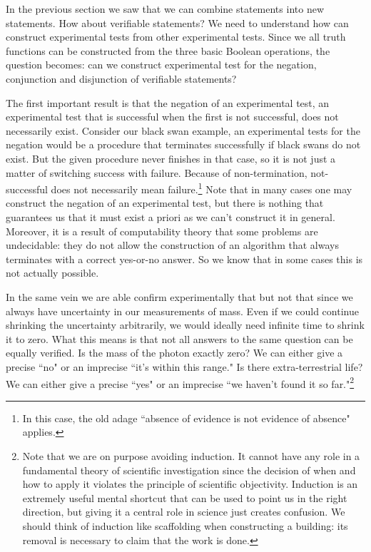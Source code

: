 \documentclass[11pt,letterpaper,fleqn]{memoir} %
\begin{document}
In the previous section we saw that we can combine statements into new statements. How about verifiable statements? We need to understand how can construct experimental tests from other experimental tests. Since we all truth functions can be constructed from the three basic Boolean operations, the question becomes: can we construct experimental test for the negation, conjunction and disjunction of verifiable statements?

The first important result is that the negation of an experimental test, an experimental test that is successful when the first is not successful, does not necessarily exist. Consider our black swan example, an experimental tests for the negation would be a procedure that terminates successfully if black swans do not exist. But the given procedure never finishes in that case, so it is not just a matter of switching success with failure. Because of non-termination, not-successful does not necessarily mean failure.\footnote{In this case, the old adage ``absence of evidence is not evidence of absence" applies.} Note that in many cases one may construct the negation of an experimental test, but there is nothing that guarantees us that it must exist a priori as we can't construct it in general. Moreover, it is a result of computability theory that some problems are undecidable: they do not allow the construction of an algorithm that always terminates with a correct yes-or-no answer. So we know that in some cases this is not actually possible.

In the same vein we are able confirm experimentally that  but not that  since we always have uncertainty in our measurements of mass. Even if we could continue shrinking the uncertainty arbitrarily, we would ideally need infinite time to shrink it to zero. What this means is that not all answers to the same question can be equally verified. Is the mass of the photon exactly zero? We can either give a precise ``no" or an imprecise ``it's within this range." Is there extra-terrestrial life? We can either give a precise ``yes" or an imprecise ``we haven't found it so far."\footnote{Note that we are on purpose avoiding induction. It cannot have any role in a fundamental theory of scientific investigation since the decision of when and how to apply it violates the principle of scientific objectivity. Induction is an extremely useful mental shortcut that can be used to point us in the right direction, but giving it a central role in science just creates confusion. We should think of induction like scaffolding when constructing a building: its removal is necessary to claim that the work is done.}
\end{document}
